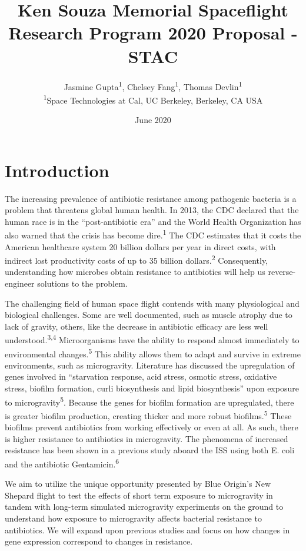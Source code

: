\documentclass[twocolumn]{article}
\title{Ken Souza Memorial Spaceflight Research Program 2020 Proposal - STAC}
\author{Jasmine Gupta\textsuperscript{1}, Chelsey Fang\textsuperscript{1}, Thomas Devlin\textsuperscript{1}
\\ \textsuperscript{1}Space Technologies at Cal, UC Berkeley, Berkeley, CA USA}
\date{June 2020}
\begin{document}
\maketitle

\section{Introduction}
The increasing prevalence of antibiotic resistance among pathogenic bacteria is a problem that threatens global human health. In 2013, the CDC declared that the human race is in the “post-antibiotic era” and the World Health Organization has also warned that the crisis has become dire.\textsuperscript{1} The CDC estimates that it costs the American healthcare system 20 billion dollars per year in direct costs, with indirect lost productivity costs of up to 35 billion dollars.\textsuperscript{2} Consequently, understanding how microbes obtain resistance to antibiotics will help us reverse-engineer solutions to the problem. 

The challenging field of human space flight contends with many physiological and biological challenges. Some are well documented, such as muscle atrophy due to lack of gravity, others, like the decrease in antibiotic efficacy are less well understood.\textsuperscript{3,4} Microorganisms have the ability to respond almost immediately to environmental changes.\textsuperscript{5} This ability allows them to adapt and survive in extreme environments, such as microgravity. Literature has discussed the upregulation of genes involved in “starvation response, acid stress, osmotic stress, oxidative stress, biofilm formation, curli biosynthesis and lipid biosynthesis” upon exposure to microgravity\textsuperscript{5}. Because the genes for biofilm formation are upregulated, there is greater biofilm production, creating thicker and more robust biofilms.\textsuperscript{5} These biofilms prevent antibiotics from working effectively or even at all. As such, there is higher resistance to antibiotics in microgravity. The phenomena of increased resistance has been shown in a previous study aboard the ISS using both E. coli and the antibiotic Gentamicin.\textsuperscript{6}

We aim to utilize the unique opportunity presented by Blue Origin’s New Shepard flight to test the effects of short term exposure to microgravity in tandem with long-term simulated microgravity experiments on the ground to understand how exposure to microgravity affects bacterial resistance to antibiotics. We will expand upon previous studies and focus on how changes in gene expression correspond to changes in resistance.
\end{document}
